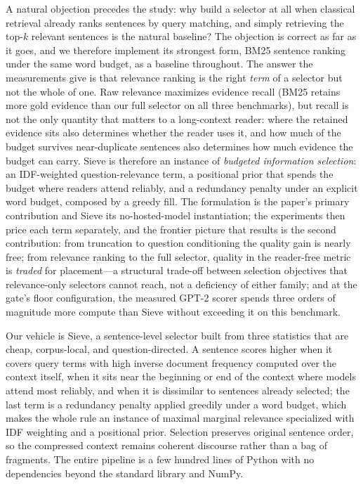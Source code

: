 \documentclass[pdflatex,sn-basic]{sn-jnl}
\theoremstyle{remark}
\newcommand{\method}{Sieve}
\begin{document}
A natural objection precedes the study: why build a selector at all
when classical retrieval already ranks sentences by query matching,
and simply retrieving the top-$k$ relevant sentences is the natural
baseline? The objection
is correct as far as it goes, and we therefore implement its strongest
form, BM25 sentence ranking under the same word budget, as a baseline
throughout. The answer the measurements give is that relevance ranking
is the right \emph{term} of a selector but not the whole of one.
Raw relevance maximizes evidence recall (BM25 retains more gold
evidence than our full selector on all three benchmarks), but recall
is not the only quantity that matters to a long-context reader: where
the retained evidence sits also determines whether the reader uses it,
and how much of the budget survives near-duplicate sentences also
determines how much evidence the budget can carry. \method{} is
therefore an instance of \emph{budgeted information selection}: an
IDF-weighted question-relevance term, a positional prior that spends
the budget where readers attend reliably, and a redundancy penalty
under an explicit word budget, composed by a greedy fill. The
formulation is the paper's primary contribution and \method{} its
no-hosted-model instantiation; the experiments then price each term
separately, and the frontier picture that results is the second
contribution: from truncation to question conditioning the quality gain
is nearly free; from relevance ranking to the full selector, quality in
the reader-free metric is \emph{traded} for placement---a structural
trade-off between selection objectives that relevance-only selectors
cannot reach, not a deficiency of either family; and at the gate's
floor configuration, the measured GPT-2 scorer spends three orders of
magnitude more compute than \method{} without exceeding it on this
benchmark.

Our vehicle is \method{}, a sentence-level selector built from three
statistics that are cheap, corpus-local, and question-directed. A
sentence scores higher when it covers query terms with high inverse
document frequency computed over the context itself, when it sits near
the beginning or end of the context where models attend most reliably,
and when it is dissimilar to sentences already selected; the last term
is a redundancy penalty applied greedily under a word budget, which
makes the whole rule an instance of maximal marginal relevance
\citep{carbonell1998mmr} specialized with IDF weighting
\citep{robertson2009bm25} and a positional prior. Selection preserves
original sentence order, so the compressed context remains coherent
discourse rather than a bag of fragments. The entire pipeline is a few
hundred lines of Python with no dependencies beyond the standard
library and NumPy.
\end{document}
